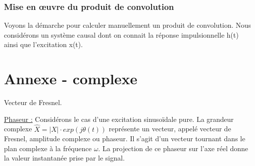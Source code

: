 \documentclass[]{report}
\begin{document}
	\subsection{Mise en œuvre du produit de convolution}
	Voyons la démarche pour calculer manuellement un produit de convolution. Nous considérons un système causal dont on connait la réponse impulsionnelle h(t) ainsi que l'excitation x(t).
	
	
	
	
\chapter*{Annexe - complexe}
	Vecteur de Fresnel.
	
	\underline{Phaseur :}
	Considérons le cas d'une excitation sinusoïdale pure. La grandeur
	complexe $ \hat{X} =|X| \cdot exp(j \theta(t)) $ représente un vecteur, appelé vecteur de Fresnel, amplitude complexe ou phaseur. Il
	s'agit d'un vecteur tournant dans le plan complexe à la fréquence $\omega$. La
	projection de ce phaseur sur l'axe réel donne la valeur instantanée
	prise par le signal.
	
	
\end{document}
